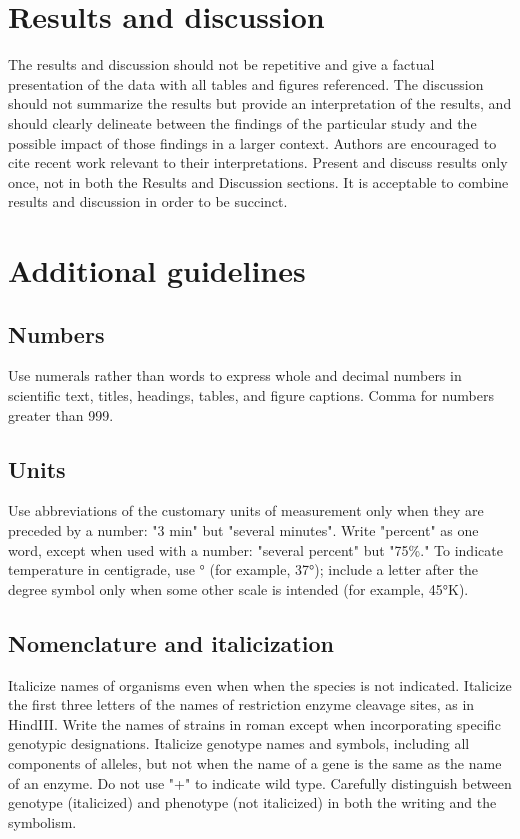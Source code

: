 \documentclass[9pt,twocolumn,twoside,lineno]{gsajnl}
\begin{document}
\section{Results and discussion}

The results and discussion should not be repetitive and give a factual presentation of the data with all tables and figures referenced. The discussion should not summarize the results but provide an interpretation of the results, and should clearly delineate between the findings of the particular study and the possible impact of those findings in a larger context. Authors are encouraged to cite recent work relevant to their interpretations. Present and discuss results only once, not in both the Results and Discussion sections. It is acceptable to combine results and discussion in order to be succinct.

\section{Additional guidelines}

\subsection{Numbers} Use numerals rather than words to express whole and decimal numbers in scientific text, titles, headings, tables, and figure captions. Comma for numbers greater than 999.

\subsection{Units} Use abbreviations of the customary units of measurement only when they are preceded by a number: "3 min" but "several minutes". Write "percent" as one word, except when used with a number: "several percent" but "75\%." To indicate temperature in centigrade, use ° (for example, 37°); include a letter after the degree symbol only when some other scale is intended (for example, 45°K).

\subsection{Nomenclature and italicization} Italicize names of organisms even when  when the species is not indicated.  Italicize the first three letters of the names of restriction enzyme cleavage sites, as in HindIII. Write the names of strains in roman except when incorporating specific genotypic designations. Italicize genotype names and symbols, including all components of alleles, but not when the name of a gene is the same as the name of an enzyme. Do not use "+" to indicate wild type. Carefully distinguish between genotype (italicized) and phenotype (not italicized) in both the writing and the symbolism.
\end{document}
